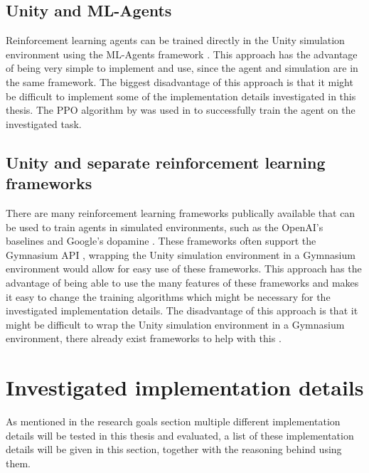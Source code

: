 \subsection*{Unity and ML-Agents}

Reinforcement learning agents can be trained directly in the Unity simulation environment using the ML-Agents framework \autocite{mlagents}. This approach has the advantage of being very simple to implement and use, since the agent and simulation are in the same framework. The biggest disadvantage of this approach is that it might be difficult to implement some of the implementation details investigated in this thesis. %
The PPO algorithm by \autocite{mlagents} was used in \autocite{maximilian} to successfully train the agent on the investigated task.

\subsection*{Unity and separate reinforcement learning frameworks}

There are many reinforcement learning frameworks publically available that can be used to train agents in simulated environments, such as the OpenAI's baselines \autocite{sb3} and Google's dopamine \autocite{dopamine}. These frameworks often support the Gymnasium API \autocite{gymnasium}, wrapping the Unity simulation environment in a Gymnasium environment would allow for easy use of these frameworks. This approach has the advantage of being able to use the many features of these frameworks and makes it easy to change the training algorithms which might be necessary for the investigated implementation details. The disadvantage of this approach is that it might be difficult to wrap the Unity simulation environment in a Gymnasium environment, there already exist frameworks to help with this \autocite{peacefulpie}.





\section{Investigated implementation details}

As mentioned in the research goals section multiple different implementation details will be tested in this thesis and evaluated, a list of these implementation details will be given in this section, together with the reasoning behind using them.


